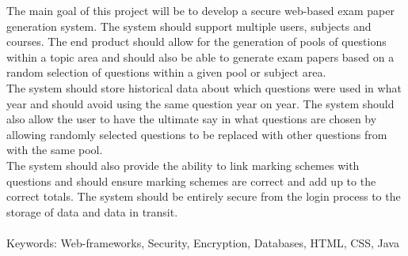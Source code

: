 

\begin{comment}
Despite the fact that an abstract is quite brief, it must do almost as much work as the multi-page
paper that follows it. In a computer science paper, this means that it should in most cases include
the following sections. Each section is typically a single sentence, although there is room for
creativity. In particular, the parts may be merged or spread among a set of sentences. Use the
following as a checklist for your next abstract (URL:
http://www.ece.cmu.edu/~koopman/essays/abstract.html):
\end{comment}

The main goal of this project will be to develop a secure web-based exam paper generation system. The system should support multiple users, subjects and courses. The end product should allow for the generation of pools of questions within a topic area and should also be able to generate exam papers based on a random selection of questions within a given pool or subject area. \\ The system should store historical data about which questions were used in what year and should avoid using the same question year on year. The system should also allow the user to have the ultimate say in what questions are chosen by allowing randomly selected questions to be replaced with other questions from with the same pool. \\ The system should also provide the ability to link marking schemes with questions and should ensure marking schemes are correct and add up to the correct totals. The system should be entirely secure from the login process to the storage of data and data in transit. \\ \\
Keywords: Web-frameworks, Security, Encryption, Databases, HTML, CSS, Java

